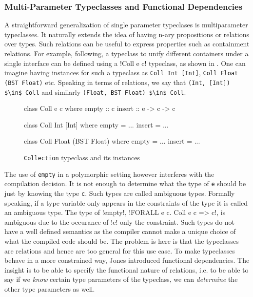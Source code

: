 \documentclass[manuscript,screen,nonacm]{acmart}
\begin{document}
\subsubsection{Multi-Parameter Typeclasses and Functional Dependencies}
A straightforward generalization of single parameter typeclases is multiparameter typeclasses. It naturally extends the idea of having n-ary propositions or relations over types. Such relations can be useful to express properties such as containment relations. For example, following\cite{jones_tcfd_2000}, a typeclass to unify different containers under a single interface can be defined using a !Coll e c! typeclass, as shown in . One can imagine having instances for such a typeclass as \lstinline{Coll Int [Int]}, \lstinline{Coll Float (BST Float)} etc. Speaking in terms of relations, we say that \lstinline{(Int, [Int]) $\in$ Coll} and similarly \lstinline{(Float, BST Float) $\in$ Coll}.

\begin{figure}[ht]
  \centering
  \begin{minipage}[ht]{0.3\linewidth}
    \begin{code}
      class Coll e c
      where
         empty :: c
         insert :: e -> c -> c
    \end{code}
  \end{minipage}%
  \begin{minipage}[ht]{0.3\linewidth}
    \begin{code}
      class Coll Int [Int]
      where
         empty = ...
         insert = ...
    \end{code}
  \end{minipage}%
  \begin{minipage}[ht]{0.3\linewidth}
    \begin{code}
      class Coll Float (BST Float)
      where
         empty = ...
         insert = ...
    \end{code}
  \end{minipage}
  \caption[Collection typeclass]{\lstinline{Collection} typeclass and its instances}
  \label{fig:tc-collection}
\end{figure}

The use of \lstinline{empty} in a polymorphic setting however interferes with the compilation decision. It is not enough to determine what the type of \lstinline{e} should be just by knowing the type \lstinline{c}. Such types are called ambiguous types. Formally speaking, if a type variable only appears in the constraints of the type it is called an ambiguous type. The type of !empty!, !FORALL e c. Coll e c => c!, is ambiguous due to the occurance of !e! only the constraint. Such types do not have a well defined semantics as the compiler cannot make a unique choice of what the compiled code should be. The problem is here is that the typeclasses are relations and hence are too general for this use case. To make typeclasses behave in a more constrained way, Jones introduced functional dependencies\cite{jones_tcfd_2000}. The insight is to be able to specify the functional nature of relations, i.e. to be able to say if we \emph{know} certain type parameters of the typeclass, we can \emph{determine} the other type parameters as well.
\end{document}
